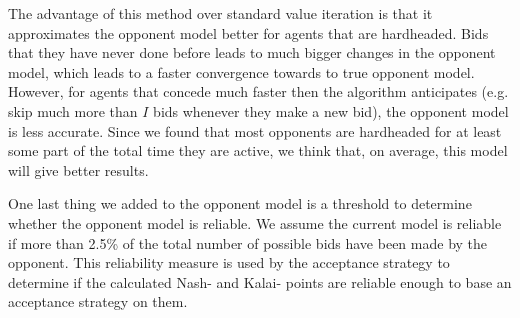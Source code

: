 The advantage of this method over standard value iteration is that it approximates the opponent model better for agents that are hardheaded. 
Bids that they have never done before leads to much bigger changes in the opponent model, which leads to a faster convergence towards to true opponent model. 
However, for agents that concede much faster then the algorithm anticipates (e.g. skip much more than $I$ bids whenever they make a new bid), the opponent model is less accurate. 
Since we found that most opponents are hardheaded for at least some part of the total time they are active, we think that, on average, this model will give better results.

One last thing we added to the opponent model is a threshold to determine whether the opponent model is reliable. We assume the current model is reliable if more than 2.5\% of the total number of possible bids have been made by the opponent. This reliability measure is used by the acceptance strategy to determine if the calculated Nash- and Kalai- points are reliable enough to base an acceptance strategy on them.